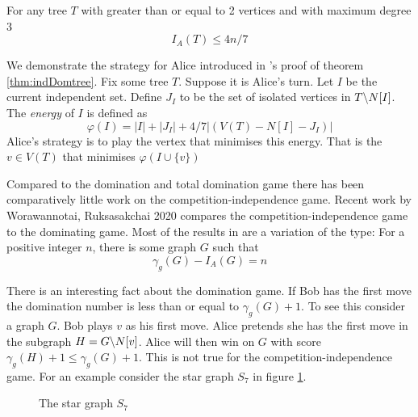 \begin{theorem}    \label{thm:indDomtree}
For any tree $T$ with greater than or equal to 2 vertices and with maximum degree 3 
\[I_A(T)\leq 4n/7\]
\end{theorem}

We demonstrate the strategy for Alice introduced in \cite{GoddardHenning2018}'s proof of theorem \ref{thm:indDomtree}. Fix some tree $T$. Suppose it is Alice's turn. Let $I$ be the current independent set. Define $J_I$ to be the set of isolated vertices in $T\backslash N[I]$. The \textit{energy} of $I$ is defined as 
    \[\varphi(I) = |I| + |J_I| + 4/7|(V(T) - N[I] - J_I)|\]
 Alice's strategy is to play the vertex  that minimises this energy. That is the $v\in V(T)$ that minimises $\varphi(I\cup\{v\})$

Compared to the domination and total domination game there has been comparatively little work on the competition-independence game. 
Recent work by Worawannotai, Ruksasakchai 2020 \cite{WorRuk2020} compares the competition-independence game to the dominating game. Most of the results in \cite{WorRuk2020} are a variation of the type: For a positive integer $n$, there is some graph $G$ such that
\[\gamma_g(G) - I_A(G) = n\]

There is an interesting fact about the domination game. If Bob has the first move the domination number is less than or equal to $\gamma_g(G) +1$. To see this consider a graph $G$. Bob plays $v$ as his first move. Alice pretends she has the first move in the subgraph $H=G\backslash N[v]$. Alice will then win on $G$ with score $\gamma_g(H)+1\leq \gamma_g(G)+1$.   
This is not true for the competition-independence game. For an example consider the star graph $S_7$ in figure \ref{fig:starS7}. 

\begin{figure}[h]
    \centering
    \caption{The star graph $S_7$}
    \label{fig:starS7}
\end{figure}

